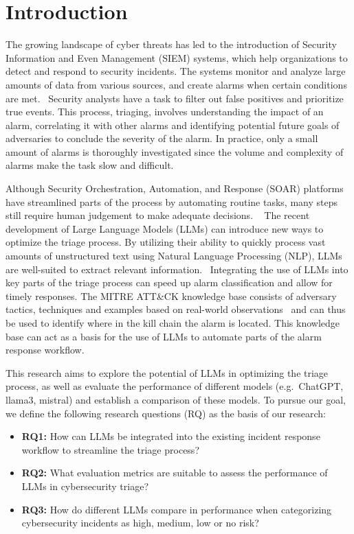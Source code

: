 \section{Introduction}
\label{sec:introduction}

The growing landscape of cyber threats has led to the introduction of Security Information and Even Management (SIEM)
systems, which help organizations to detect and respond to security incidents.
The systems monitor and analyze large amounts of data from various sources, and create alarms when certain conditions
are met.\ \citep{ibmsiem}
Security analysts have a task to filter out false positives and prioritize true events.
This process, triaging, involves understanding the impact of an alarm, correlating it with other alarms and identifying
potential future goals of adversaries to conclude the severity of the alarm.
In practice, only a small amount of alarms is thoroughly investigated since the volume and complexity of alarms make
the task slow and difficult.\ \citep{chen2024elevating}

Although Security Orchestration, Automation, and Response (SOAR) platforms have streamlined parts of the process by
automating routine tasks, many steps still require human judgement to make adequate decisions.
\ \citep{chuvakin2019triaging}
The recent development of Large Language Models (LLMs) can introduce new ways to optimize the triage process.
By utilizing their ability to quickly process vast amounts of unstructured text using Natural Language Processing (NLP),
LLMs are well-suited to extract relevant information.\ \citep{chaudhary2024ai}
Integrating the use of LLMs into key parts of the triage process can speed up alarm classification and allow for timely
responses.
The MITRE ATT\&CK knowledge base consists of adversary tactics, techniques and examples based on real-world
observations\ \citep{strom2018mitre} and can thus be used to identify where in the kill chain the alarm is located.
This knowledge base can act as a basis for the use of LLMs to automate parts of the alarm response workflow.

This research aims to explore the potential of LLMs in optimizing the triage process, as well as evaluate the
performance of different models (e.g.\ ChatGPT, llama3, mistral) and establish a comparison of these models.
To pursue our goal, we define the following research questions (RQ) as the basis of our research:

\begin{itemize}
    \item \textbf{RQ1:} How can LLMs be integrated into the existing incident response workflow to streamline the triage process?
    \item \textbf{RQ2:} What evaluation metrics are suitable to assess the performance of LLMs in cybersecurity triage?
    \item \textbf{RQ3:} How do different LLMs compare in performance when categorizing cybersecurity incidents as high, medium, low or no risk?
\end{itemize}

